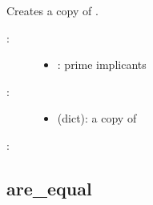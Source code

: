 \documentclass[letterpaper,10pt,english]{sphinxmanual}
\begin{document}
\begin{fulllineitems}
\label{\detokenize{PrimeImplicants:PyBoolNet.PrimeImplicants.copy}}
Creates a copy of .
\begin{description}
\item[{:}] \leavevmode\begin{itemize}
\item {} 
: prime implicants

\end{itemize}

\item[{:}] \leavevmode\begin{itemize}
\item {} 
 (dict): a copy of 

\end{itemize}

\end{description}

:

\begin{sphinxVerbatim}[commandchars=\\\{\}]
  
\end{sphinxVerbatim}

\end{fulllineitems}



\subsection{are\_equal}
\label{\detokenize{PrimeImplicants:id2}}\label{\detokenize{PrimeImplicants:are-equal}}
\end{document}
